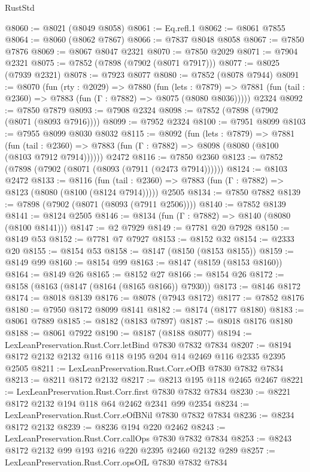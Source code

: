 \begin{lexlean}{RustStd}
\begin{coremodule}
{\begin{coremodule}
{{{{{{{{{{{{{{{{{{{{{{{{{{{{{{{{{{{{{@8060 := @8021 (@8049 @8058)
@8061 := Eq.refl.{1}
@8062 := @8061 @7855
@8064 := @8060 (@8062 @7867)
@8066 := @7837 @8048 @8058
@8067 := @7850 @7876
@8069 := @8067 @8047 @2321
@8070 := @7850 @2029
@8071 := @7904 @2321
@8075 := @7852 (@7898 (@7902 (@8071 @7917)))
@8077 := @8025 (@7939 @2321)
@8078 := @7923 @8077
@8080 := @7852 (@8078 @7944)
@8091 := @8070
    (fun (rty : @2029) =>
    @7880
      (fun (lets : @7879) =>
      @7881 (fun (tail : @2360) => @7883 (fun (Γ : @7882) => @8075 (@8080 @8036)))))
    @2324
@8092 := @7850 @7879
@8093 := @7908 @2324
@8098 := @7852 (@7898 (@7902 (@8071 (@8093 @7916))))
@8099 := @7952 @2324
@8100 := @7951 @8099
@8103 := @7955 @8099 @8030 @8032
@8115 := @8092
    (fun (lets : @7879) =>
    @7881
      (fun (tail : @2360) => @7883 (fun (Γ : @7882) => @8098 (@8080 (@8100 (@8103 @7912 @7914))))))
    @2472
@8116 := @7850 @2360
@8123 := @7852 (@7898 (@7902 (@8071 (@8093 (@7911 (@2473 @7914))))))
@8124 := @8103 @2472
@8133 := @8116
    (fun (tail : @2360) => @7883 (fun (Γ : @7882) => @8123 (@8080 (@8100 (@8124 @7914)))))
    @2505
@8134 := @7850 @7882
@8139 := @7898 (@7902 (@8071 (@8093 (@7911 @2506))))
@8140 := @7852 @8139
@8141 := @8124 @2505
@8146 := @8134 (fun (Γ : @7882) => @8140 (@8080 (@8100 @8141)))
@8147 := @2 @7929
@8149 := @7781 @20 @7928
@8150 := @8149 @53
@8152 := @7781 @7 @7927
@8153 := @8152 @32
@8154 := @2333 @20
@8155 := @8154 @53
@8158 := @8147 (@8150 (@8153 @8155))
@8159 := @8149 @99
@8160 := @8154 @99
@8163 := @8147 (@8159 (@8153 @8160))
@8164 := @8149 @26
@8165 := @8152 @27
@8166 := @8154 @26
@8172 := @8158 (@8163 (@8147 (@8164 (@8165 @8166)) @7930))
@8173 := @8146 @8172
@8174 := @8018 @8139
@8176 := @8078 (@7943 @8172)
@8177 := @7852 @8176
@8180 := @7950 @8172 @8099 @8141
@8182 := @8174 (@8177 @8180)
@8183 := @8061 @7889
@8185 := @8182 (@8183 @7897)
@8187 := @8018 @8176 @8180
@8188 := @8061 @7922
@8190 := @8187 (@8188 @8077)
@8194 := LexLeanPreservation.Rust.Corr.letBind @7830 @7832 @7834
@8207 := @8194 @8172 @2132 @2132 @116 @118 @195 @204 @14 @2469 @116 @2335 @2395 @2505
@8211 := LexLeanPreservation.Rust.Corr.eOfB @7830 @7832 @7834
@8213 := @8211 @8172 @2132
@8217 := @8213 @195 @118 @2465 @2467
@8221 := LexLeanPreservation.Rust.Corr.first @7830 @7832 @7834
@8230 := @8221 @8172 @2132 @194 @118 @64 @2462 @2341 @99 @2354
@8234 := LexLeanPreservation.Rust.Corr.eOfBNil @7830 @7832 @7834
@8236 := @8234 @8172 @2132
@8239 := @8236 @194 @220 @2462
@8243 := LexLeanPreservation.Rust.Corr.callOps @7830 @7832 @7834
@8253 := @8243 @8172 @2132 @99 @193 @216 @220 @2395 @2460 @2132 @289
@8257 := LexLeanPreservation.Rust.Corr.opsOfL @7830 @7832 @7834
}}}}}}}}}}}}}}}}}}}}}}}}}}}}}}}}}}}}}
\end{coremodule}}
\end{coremodule}
\end{lexlean}
